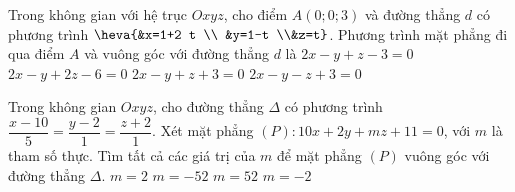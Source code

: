 \begin{ex}%
	Trong không gian với hệ trục $Oxyz$, cho điểm $A(0;0;3)$ và đường thẳng $d$ có phương trình $ \heva{&x=1+2 t \\ &y=1-t \\&z=t}$. Phương trình mặt phẳng đi qua điểm $A$ và vuông góc với đường thẳng $d$ là
	\choice
		{\True $2x-y+z-3=0$}
		{$2x-y+2 z-6=0$}
		{$2x-y+z+3=0$}
		{$2x-y-z+3=0$}
\end{ex}

\begin{ex}%
	Trong không gian $Oxyz$, cho đường thẳng $\Delta$ có phương trình $\dfrac{x-10}{5}=\dfrac{y-2}{1}=\dfrac{z+2}{1}$. Xét mặt phẳng $(P)\colon 10x+2y+m z+11=0$, với $m$ là tham số thực. Tìm tất cả các giá trị của $m$ để mặt phẳng $(P)$ vuông góc với đường thẳng $\Delta$.
	\choice 
		{\True $m=2$}
		{$m=-52$}
		{$m=52$}
		{$m=-2$}
\end{ex}

